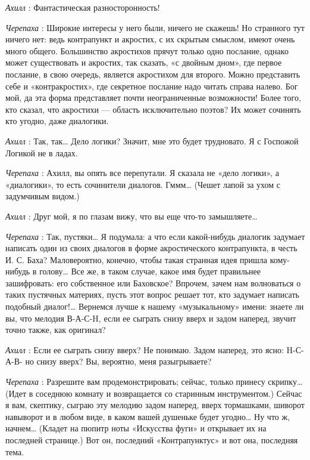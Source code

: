 \emph{Ахилл} : Фантастическая разносторонность!

\emph{Черепаха} : Широкие интересы у него были, ничего не скажешь! Но странного тут ничего нет: ведь контрапункт и акростих, с их скрытым смыслом, имеют очень много общего. Большинство акростихов прячут только одно послание, однако может существовать и акростих, так сказать, «с двойным дном», где первое послание, в свою очередь, является акростихом для второго. Можно представить себе и «контракростих», где секретное послание надо читать справа налево. Бог мой, да эта форма представляет почти неограниченные возможности! Более того, кто сказал, что акростихи --- область исключительно поэтов? Их может сочинять кто угодно, даже диалогики.

\emph{Ахилл} : Так, так\ldots{} Дело логики? Значит, мне это будет трудновато. Я с Госпожой Логикой не в ладах.

\emph{Черепаха} : Ахилл, вы опять все перепутали. Я сказала не «дело логики», а «диалогики», то есть сочинители диалогов. Гммм\ldots{} (Чешет лапой за ухом с задумчивым видом.)

\emph{Ахилл} : Друг мой, я по глазам вижу, что вы еще что-то замышляете\ldots{}

\emph{Черепаха} : Так, пустяки\ldots{} Я подумала: а что если какой-нибудь диалогик задумает написать один из своих диалогов в форме акростического контрапункта, в честь И. С. Баха? Маловероятно, конечно, чтобы такая странная идея пришла кому-нибудь в голову\ldots{} Все же, в таком случае, какое имя будет правильнее зашифровать: его собственное или Баховское? Впрочем, зачем нам волноваться о таких пустячных материях, пусть этот вопрос решает тот, кто задумает написать подобный диалог!\ldots{} Вернемся лучше к нашему «музыкальному» имени: знаете ли вы, что мелодия В-А-С-H, если ее сыграть снизу вверх и задом наперед, звучит точно также, как оригинал?

\emph{Ахилл} : Если ее сыграть снизу вверх? Не понимаю. Задом наперед, это ясно: H-С-А-В- но снизу вверх? Вы, вероятно, меня разыгрываете?

\emph{Черепаха} : Разрешите вам продемонстрировать; сейчас, только принесу скрипку\ldots{} (Идет в соседнюю комнату и возвращается со старинным инструментом.) Сейчас я вам, скептику, сыграю эту мелодию задом наперед, вверх тормашками, шиворот навыворот и в любом виде, в каком вашей душеньке будет угодно\ldots{} Ну что ж, начнем\ldots{} (Кладет на пюпитр ноты «Искусства фуги» и открывает их на последней странице.) Вот он, последний «Контрапунктус» и вот она, последняя тема.

